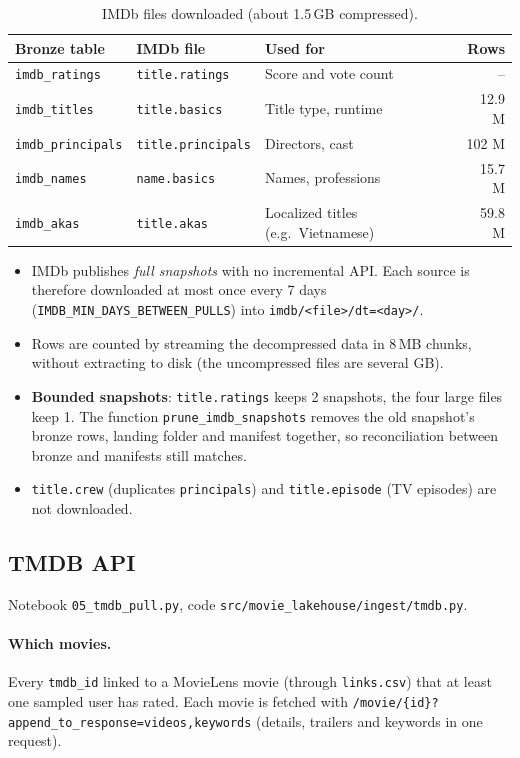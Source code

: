 \documentclass[12pt,a4paper]{article}
\newcommand{\code}[1]{\texttt{#1}}
\begin{document}
\begin{table}[H]
\centering\small
\begin{tabularx}{\textwidth}{@{}llXr@{}}
\toprule
Bronze table & IMDb file & Used for & Rows \\
\midrule
\code{imdb\_ratings} & \code{title.ratings} & Score and vote count & -- \\
\code{imdb\_titles} & \code{title.basics} & Title type, runtime & 12.9 M \\
\code{imdb\_principals} & \code{title.principals} & Directors, cast & 102 M \\
\code{imdb\_names} & \code{name.basics} & Names, professions & 15.7 M \\
\code{imdb\_akas} & \code{title.akas} & Localized titles (e.g.\ Vietnamese) & 59.8 M \\
\bottomrule
\end{tabularx}
\caption{IMDb files downloaded (about 1.5\,GB compressed).}
\end{table}

\begin{itemize}
  \item IMDb publishes \emph{full snapshots} with no incremental API. Each source is therefore downloaded at most once
        every 7 days (\code{IMDB\_MIN\_DAYS\_BETWEEN\_PULLS}) into \code{imdb/<file>/dt=<day>/}.
  \item Rows are counted by streaming the decompressed data in 8\,MB chunks, without extracting to disk (the
        uncompressed files are several GB).
  \item \textbf{Bounded snapshots}: \code{title.ratings} keeps 2 snapshots, the four large files keep 1. The function
        \code{prune\_imdb\_snapshots} removes the old snapshot's bronze rows, landing folder and manifest together, so
        reconciliation between bronze and manifests still matches.
  \item \code{title.crew} (duplicates \code{principals}) and \code{title.episode} (TV episodes) are not downloaded.
\end{itemize}

\subsection{TMDB API}
Notebook \code{05\_tmdb\_pull.py}, code \code{src/movie\_lakehouse/ingest/tmdb.py}.

\paragraph{Which movies.} Every \code{tmdb\_id} linked to a MovieLens movie (through \code{links.csv}) that at least one
sampled user has rated. Each movie is fetched with \code{/movie/\{id\}?append\_to\_response=videos,keywords} (details,
trailers and keywords in one request).
\end{document}
